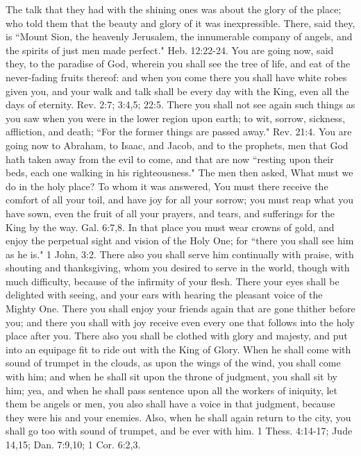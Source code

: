 The talk that they had with the shining ones was about the glory of the place; who told them that the beauty and glory of it was inexpressible. There, said they, is ``Mount Sion, the heavenly Jerusalem, the innumerable company of angels, and the spirits of just men made perfect." Heb. 12:22-24. You are going now, said they, to the paradise of God, wherein you shall see the tree of life, and eat of the never-fading fruits thereof: and when you come there you shall have white robes given you, and your walk and talk shall be every day with the King, even all the days of eternity. Rev. 2:7; 3:4,5; 22:5. There you shall not see again such things as you saw when you were in the lower region upon earth; to wit, sorrow, sickness, affliction, and death; ``For the former things are passed away." Rev. 21:4. You are going now to Abraham, to Isaac, and Jacob, and to the prophets, men that God hath taken away from the evil to come, and that are now ``resting upon their beds, each one walking in his righteousness." The men then asked, What must we do in the holy place? To whom it was answered, You must there receive the comfort of all your toil, and have joy for all your sorrow; you must reap what you have sown, even the fruit of all your prayers, and tears, and sufferings for the King by the way. Gal. 6:7,8. In that place you must wear crowns of gold, and enjoy the perpetual sight and vision of the Holy One; for ``there you shall see him as he is." 1 John, 3:2. There also you shall serve him continually with praise, with shouting and thanksgiving, whom you desired to serve in the world, though with much difficulty, because of the infirmity of your flesh. There your eyes shall be delighted with seeing, and your ears with hearing the pleasant voice of the Mighty One. There you shall enjoy your friends again that are gone thither before you; and there you shall with joy receive even every one that follows into the holy place after you. There also you shall be clothed with glory and majesty, and put into an equipage fit to ride out with the King of Glory. When he shall come with sound of trumpet in the clouds, as upon the wings of the wind, you shall come with him; and when he shall sit upon the throne of judgment, you shall sit by him; yea, and when he shall pass sentence upon all the workers of iniquity, let them be angels or men, you also shall have a voice in that judgment, because they were his and your enemies. Also, when he shall again return to the city, you shall go too with sound of trumpet, and be ever with him. 1 Thess. 4:14-17; Jude 14,15; Dan. 7:9,10; 1 Cor. 6:2,3.

